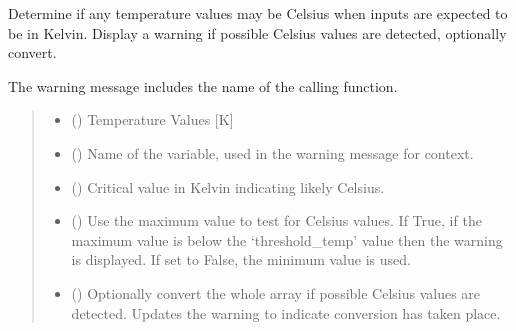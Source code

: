 \documentclass[letterpaper,10pt,english]{sphinxmanual}
\begin{document}
\begin{fulllineitems}
\label{\detokenize{users_guide:AirSeaFluxCode.util_subs.validate_kelvin}}
\pysigstartsignatures
\pysiglinewithargsret
{}
{\sphinxparamcomma {}\sphinxparamcomma {}\sphinxparamcomma {}\sphinxparamcomma {}}
{}
\pysigstopsignatures
\sphinxAtStartPar
Determine if any temperature values may be Celsius when inputs are expected
to be in Kelvin. Display a warning if possible Celsius values are detected,
optionally convert.

\sphinxAtStartPar
The warning message includes the name of the calling function.
\begin{quote}\begin{description}
\begin{itemize}
\item {}
\sphinxAtStartPar
{} () \textendash{} Temperature Values {[}K{]}

\item {}
\sphinxAtStartPar
{} () \textendash{} Name of the variable, used in the warning message for context.

\item {}
\sphinxAtStartPar
{} () \textendash{} Critical value in Kelvin indicating likely Celsius.

\item {}
\sphinxAtStartPar
{} () \textendash{} Use the maximum value to test for Celsius values. If True, if the
maximum value is below the ‘threshold\_temp’ value then the warning
is displayed. If set to False, the minimum value is used.

\item {}
\sphinxAtStartPar
{} () \textendash{} Optionally convert the whole array if possible Celsius values are
detected. Updates the warning to indicate conversion has taken place.


\end{itemize}
\end{description}
\end{quote}
\end{fulllineitems}
\end{document}
